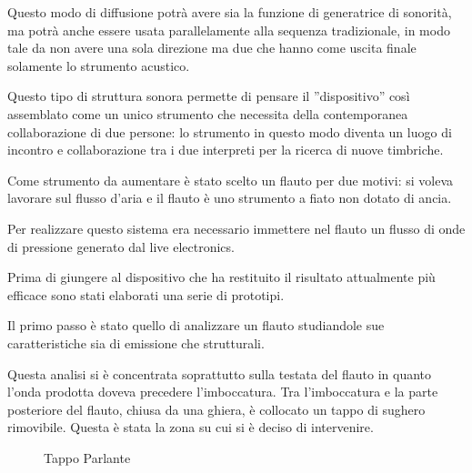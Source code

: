 Questo modo di diffusione potrà avere sia la funzione di generatrice di
sonorità, ma potrà anche essere usata parallelamente alla sequenza tradizionale,
in modo tale da non avere una sola direzione ma due che hanno come uscita
finale solamente lo strumento acustico.

Questo tipo di struttura sonora  permette di pensare il ”dispositivo” così
assemblato come   un unico strumento  che necessita della contemporanea
collaborazione di due persone: lo strumento in questo modo diventa un luogo di
incontro e collaborazione tra i due interpreti per la ricerca di nuove timbriche.

Come strumento da aumentare è stato scelto un flauto per due motivi: si voleva
lavorare sul flusso d’aria e il flauto è uno strumento a fiato non dotato di ancia.

Per realizzare questo  sistema era necessario immettere nel flauto un flusso di
onde di pressione generato dal live electronics.

Prima di giungere al dispositivo che ha restituito il risultato attualmente più
efficace sono stati elaborati una serie di prototipi.

Il primo passo è stato quello di analizzare un flauto studiandole sue
caratteristiche sia di emissione che strutturali.

Questa analisi si è concentrata soprattutto sulla testata del flauto in quanto l’onda prodotta doveva precedere l’imboccatura.
Tra l’imboccatura e la parte posteriore del flauto, chiusa da una ghiera, è collocato un tappo di sughero rimovibile. Questa è stata la zona su cui si è deciso di intervenire.

\begin{figure}
\centering
{} \quad
{}
\caption{Tappo Parlante}
\end{figure}

